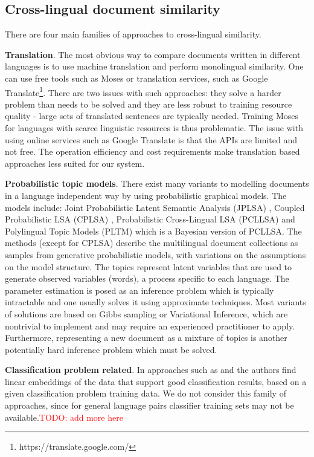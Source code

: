 \documentclass[twoside,11pt]{article}
\newcommand{\todo}[1]{\textcolor{red}{TODO: #1}}
\begin{document}
\subsection{Cross-lingual document similarity}

There are four main families of approaches to cross-lingual similarity.

\textbf{Translation}. The most obvious way to compare documents written in different languages is to use machine translation and perform monolingual similarity. One can use free tools such as Moses  or translation services, such as Google Translate\footnote{https://translate.google.com/}. There are two issues with such approaches: they solve a harder problem than needs to be solved and they are less robust to training resource quality - large sets of translated sentences are typically needed. Training Moses for languages with scarce linguistic resources is thus problematic. The issue with using online services such as Google Translate is that the APIs are limited and not free. The operation efficiency and cost requirements make translation based approaches less suited for our system.

\textbf{Probabilistic topic models}. There exist many variants to modelling documents in a language independent way by using probabilistic graphical models. The models include:  Joint Probabilistic Latent Semantic Analysis (JPLSA) , Coupled Probabilistic LSA (CPLSA) \cite{platt2010translingual}, Probabilistic Cross-Lingual LSA (PCLLSA)\cite{PCL_LSA} and Polylingual Topic Models (PLTM)  which is a Bayesian version of PCLLSA. The methods (except for CPLSA) describe the multilingual document collections as samples from generative probabilistic models, with variations on the assumptions on the model structure. The topics represent latent variables that are used to generate observed variables (words), a process specific to each language. The parameter estimation is posed as an inference problem which is typically intractable and one usually solves it using approximate techniques. Most variants of solutions are based on Gibbs sampling or Variational Inference, which are nontrivial to implement and may require an experienced practitioner to apply. Furthermore, representing a new document as a mixture of topics is another potentially hard inference problem which must be solved.

\textbf{Classification problem related}. In approaches such as \cite{cotrain} and  the authors find linear embeddings of the data that support good classification results, based on a given classification problem training data. We do not consider this family of approaches, since for general language pairs classifier training sets may not be available.\todo{add more here}
\end{document}
